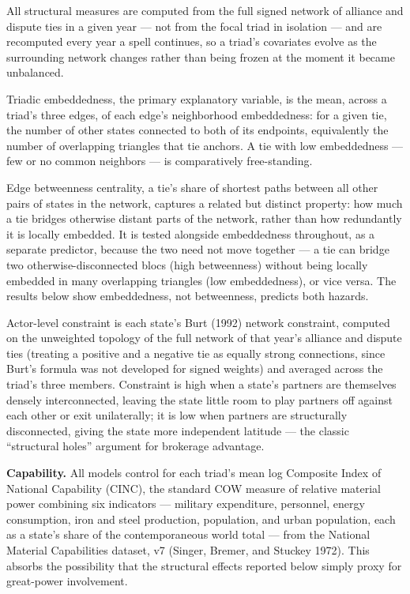 \documentclass[Afour,sageh,times,doublespace]{sagej}
\begin{document}
All structural measures are computed from the full signed network of alliance and dispute ties in a given year --- not from the focal triad in isolation --- and are recomputed every year a spell continues, so a triad's covariates evolve as the surrounding network changes rather than being frozen at the moment it became unbalanced.

Triadic embeddedness, the primary explanatory variable, is the mean, across a triad's three edges, of each edge's neighborhood embeddedness: for a given tie, the number of other states connected to both of its endpoints, equivalently the number of overlapping triangles that tie anchors. A tie with low embeddedness --- few or no common neighbors --- is comparatively free-standing.

Edge betweenness centrality, a tie's share of shortest paths between all other pairs of states in the network, captures a related but distinct property: how much a tie bridges otherwise distant parts of the network, rather than how redundantly it is locally embedded. It is tested alongside embeddedness throughout, as a separate predictor, because the two need not move together --- a tie can bridge two otherwise-disconnected blocs (high betweenness) without being locally embedded in many overlapping triangles (low embeddedness), or vice versa. The results below show embeddedness, not betweenness, predicts both hazards.

Actor-level constraint is each state's Burt (1992) network constraint, computed on the unweighted topology of the full network of that year's alliance and dispute ties (treating a positive and a negative tie as equally strong connections, since Burt's formula was not developed for signed weights) and averaged across the triad's three members. Constraint is high when a state's partners are themselves densely interconnected, leaving the state little room to play partners off against each other or exit unilaterally; it is low when partners are structurally disconnected, giving the state more independent latitude --- the classic ``structural holes'' argument for brokerage advantage.

\textbf{Capability.} All models control for each triad's mean log Composite Index of National Capability (CINC), the standard COW measure of relative material power combining six indicators --- military expenditure, personnel, energy consumption, iron and steel production, population, and urban population, each as a state's share of the contemporaneous world total --- from the National Material Capabilities dataset, v7 (Singer, Bremer, and Stuckey 1972). This absorbs the possibility that the structural effects reported below simply proxy for great-power involvement.
\end{document}
